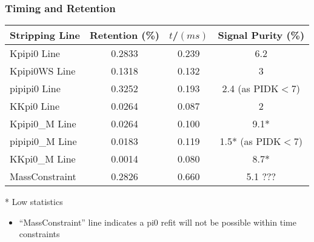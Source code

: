 \documentclass[10pt,a4paper]{beamer}
\begin{document}
\begin{frame}
\frametitle{Timing and Retention}
\begin{center}
\begin{tabular}{l|ccc}
\hline
\hline
\vspace{0.5em}
Stripping Line & Retention (\%)  & $t$/$(ms)$ & Signal Purity (\%) \\
\hline
Kpipi0 Line       & 0.2833         & 0.239      & 6.2                \\
Kpipi0WS  Line    & 0.1318         & 0.132      & 3                  \\
pipipi0 Line      & 0.3252         & 0.193      & 2.4 (as PIDK$<$7) \\
KKpi0 Line        & 0.0264         & 0.087      & 2                  \\
Kpipi0\_M Line    & 0.0264         & 0.100      & 9.1*                \\
pipipi0\_M Line   & 0.0183         & 0.119      & 1.5* (as PIDK$<$7)   \\
KKpi0\_M Line     & 0.0014         & 0.080      & 8.7*                \\
MassConstraint    & 0.2826         & 0.660      & 5.1 ???            \\
\hline
\hline
\end{tabular}
\newline
\vspace{1.0em}
* Low statistics
\end{center}
\vspace{1.0em}
\begin{itemize}
\item{``MassConstraint'' line indicates a pi0 refit will not be possible within time constraints}
\end{itemize}
\end{frame}
\end{document}

